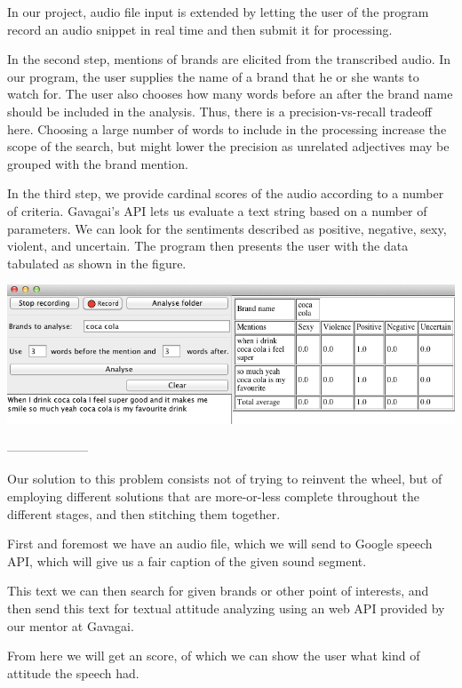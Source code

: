 \documentclass[a4paper,12pt,twoside]{ltxdoc}
\begin{document}
In our project, audio file input is extended by letting the user of the program record an audio snippet in real time and
then submit it for processing.

In the second step, mentions of brands are elicited from the transcribed audio. In our program, the user supplies the name
of a brand that he or she wants to watch for. The user also chooses how many words before an after the brand name should
be included in the analysis. Thus, there is a precision-vs-recall tradeoff here. Choosing a large number of words to include
in the processing increase the scope of the search, but might lower the precision as unrelated adjectives may be grouped
with the brand mention.

In the third step, we provide cardinal scores of the audio according to a number of criteria. Gavagai's API lets us
evaluate a text string based on a number of parameters. We can look for the sentiments described as positive, negative, sexy, violent,
and uncertain. The program then presents the user with the data tabulated as shown in the figure. %

\begin{center}
\includegraphics[scale=0.60]{../poster/screenshot_crop.png}
\end{center}

--------------------

Our solution to this problem consists not of trying to reinvent the wheel, but of employing different
solutions that are more-or-less complete throughout the different stages, and then stitching them together.

First and foremost we have an audio file, which we will send to Google speech API, which will give us a fair caption of the given sound segment.

This text we can then search for given brands or other point of interests, and then send this text for textual attitude analyzing using an web API provided by our mentor at Gavagai.

From here we will get an score, of which we can show the user what kind of attitude the speech had. 
\end{document}
